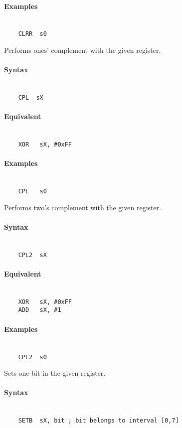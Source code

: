     \paragraph{Examples}
        ~\\
        \verb'    CLRR  s0'

\clearpage
{}
    Performs ones' complement with the given register.

    \paragraph{Syntax}
        ~\\
        \verb'    CPL  sX'

    \paragraph{Equivalent}
        ~\\
        \verb'    XOR   sX, #0xFF'

    \paragraph{Examples}
        ~\\
        \verb'    CPL   s0'

    Performs two's complement with the given register.

    \paragraph{Syntax}
        ~\\
        \verb'    CPL2  sX'

    \paragraph{Equivalent}
        ~\\
        \verb'    XOR   sX, #0xFF'\\
        \verb'    ADD   sX, #1'

    \paragraph{Examples}
        ~\\
        \verb'    CPL2  s0'

    Sets one bit in the given register.

    \paragraph{Syntax}
        ~\\
        \verb'    SETB  sX, bit ; bit belongs to interval [0,7]'

